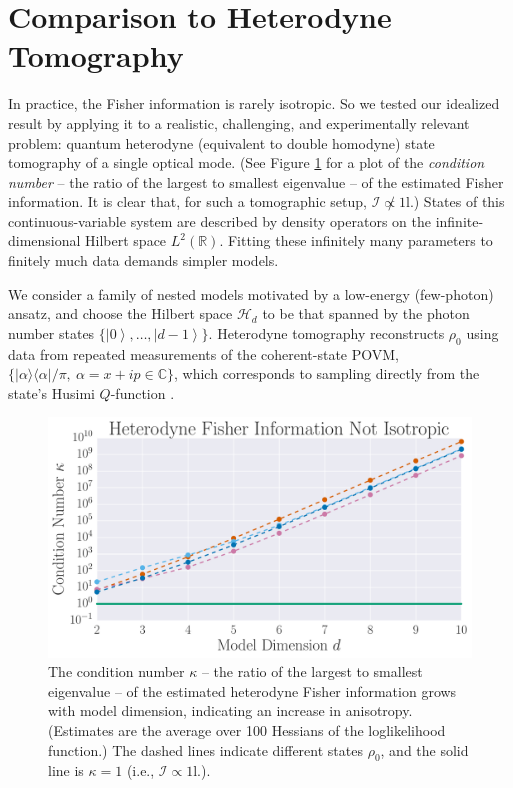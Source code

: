 \documentclass[aps,pra, twocolumn]{revtex4-1}
\newcommand{\reals}{\mathbb{R}}
\newcommand{\ket}[1]{\ensuremath{\left|#1\right\rangle}}
\def\Id{1\!\mathrm{l}}
\begin{document}
\section{Comparison to Heterodyne Tomography}
In practice, the Fisher information is rarely isotropic.  So we tested our idealized result by applying it to a realistic, challenging, and experimentally relevant problem: quantum heterodyne (equivalent to double homodyne) state tomography \cite{Lvovsky2001a, Bertrand1987, Leonhardt1995, Lvovsky2009} of a single optical mode.  (See Figure \ref{fig:fish_condition} for a plot of the \emph{condition number} -- the ratio of the largest to smallest eigenvalue -- of the estimated Fisher information. It is clear that, for such a tomographic setup, $\mathcal{I} \not \propto \Id$.) States of this continuous-variable system are described by density operators on the infinite-dimensional Hilbert space $L^2(\reals)$.  Fitting these infinitely many parameters to finitely much data demands simpler models.

We consider a family of nested models motivated by a low-energy (few-photon) ansatz, and choose   
the Hilbert space $\mathcal{H}_d$ to be that spanned by the photon number states $\{\ket{0},\ldots ,\ket{d-1}\}$.
Heterodyne tomography reconstructs $\rho_{0}$ using data from repeated measurements of the 
coherent-state POVM, $\{|\alpha\rangle\langle \alpha| /\pi, ~\alpha=x+ip\in \mathbb{C}\}$, which corresponds to sampling directly from the 
state's Husimi $Q$-function \cite{Husimi1940}.

\begin{figure}[h]
  \includegraphics[width=\columnwidth]{Images/Figure_6.pdf}
 \caption{The condition number $\kappa$ -- the ratio of the largest to smallest eigenvalue -- of the estimated heterodyne Fisher information grows with model dimension, indicating an increase in anisotropy. (Estimates are the average over 100 Hessians of the loglikelihood function.) The dashed lines indicate different states $\rho_{0}$, and the solid line is $\kappa = 1$ (i.e., $\mathcal{I} \propto \Id$.).}
\label{fig:fish_condition}
\end{figure}
\end{document}
